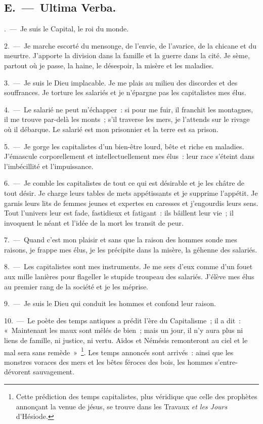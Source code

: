 \documentclass[french,twoside]{book} %
\begin{document}
\subsection[{E. — Ultima Verba.}]{E. — Ultima Verba.}
. — Je suis le Capital, le roi du monde.\par
2. — Je marche escorté du mensonge, de l’envie, de l’avarice, de la chicane et du meurtre. J'apporte la division dans la famille et la guerre dans la cité. Je sème, partout où je passe, la haine, le désespoir, la misère et les maladies.\par
3. — Je suis le Dieu implacable. Je me plais au milieu des discordes et des souffrances. Je torture les salariés et je n’épargne pas les capitalistes mes élus.\par
4. — Le salarié ne peut m’échapper : si pour me fuir, il franchit les montagnes, il me trouve par-delà les monts ; s’il traverse les mers, je l’attends sur le rivage où il débarque. Le salarié est mon prisonnier et la terre est sa prison.\par
5. — Je gorge les capitalistes d’un bien-être lourd, bête et riche en maladies. J'émascule corporellement et intellectuellement mes élus : leur race s’éteint dans l’imbécillité et l’impuissance.\par
6. — Je comble les capitalistes de tout ce qui est désirable et je les châtre de tout désir. Je charge leurs tables de mets appétissants et je supprime l’appétit. Je garnis leurs lits de femmes jeunes et expertes en caresses et j’engourdis leurs sens. Tout l’univers leur est fade, fastidieux et fatigant : ils bâillent leur vie ; il invoquent le néant et l’idée de la mort les transit de peur.\par
7. — Quand c’est mon plaisir et sans que la raison des hommes sonde mes raisons, je frappe mes élus, je les précipite dans la misère, la géhenne des salariés.\par
8. — Les capitalistes sont mes instruments. Je me sers d’eux comme d’un fouet aux mille lanières pour flageller le stupide troupeau des salariés. J'élève mes élus au premier rang de la société et je les méprise.\par
9. — Je suis le Dieu qui conduit les hommes et confond leur raison.\par
10. — Le poète des temps antiques a prédit l’ère du Capitalisme ; il a dit : « Maintenant les maux sont mêlés de bien ; mais un jour, il n’y aura plus ni liens de famille, ni justice, ni vertu. Aïdos et Némésis remonteront au ciel et le mal sera sans remède » \footnote{Cette prédiction des temps capitalistes, plus véridique que celle des prophètes annonçant la venue de jésus, se trouve dans les Travaux \emph{et les Jours} d’Hésiode.}. Les temps annoncés sont arrivés : ainsi que les monstres voraces des mers et les bêtes féroces des bois, les hommes s’entre-dévorent sauvagement.\par
\end{document}
